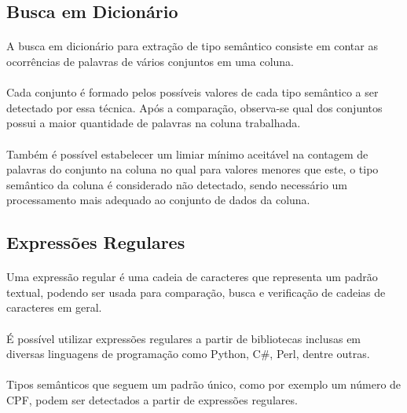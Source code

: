 \subsection{Busca em Dicionário}

\paragraph{} A busca em dicionário para extração de tipo semântico consiste em contar as ocorrências de palavras de vários conjuntos em uma coluna. 

\paragraph{} Cada conjunto é formado pelos possíveis valores de cada tipo semântico a ser detectado por essa técnica. Após a comparação, observa-se qual dos conjuntos possui a maior quantidade de palavras na coluna trabalhada. 

\paragraph{} Também é possível estabelecer um limiar mínimo aceitável na contagem de palavras do conjunto na coluna no qual para valores menores que este, o tipo semântico da coluna é considerado não detectado, sendo necessário um processamento mais adequado ao conjunto de dados da coluna.

\subsection{Expressões Regulares}

\paragraph{} Uma expressão regular é uma cadeia de caracteres que representa um padrão textual\cite{goyvaerts2012regular}, podendo ser usada para comparação, busca e verificação de cadeias de caracteres em geral.

\paragraph{} É possível utilizar expressões regulares a partir de bibliotecas inclusas em diversas linguagens de programação como Python, C\#, Perl, dentre outras.

\paragraph{} Tipos semânticos que seguem um padrão único, como por exemplo um número de CPF, podem ser detectados a partir de expressões regulares.

